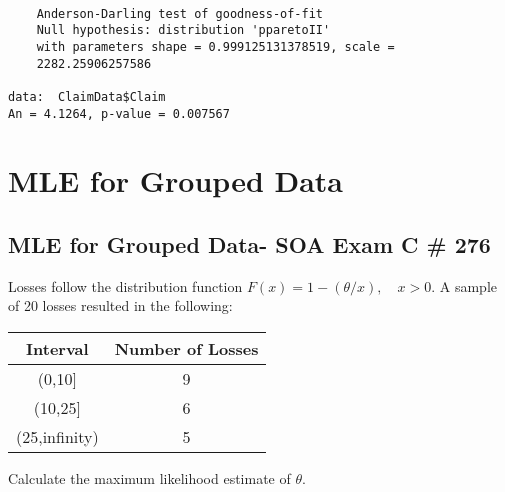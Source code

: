 \documentclass[]{book}
\newenvironment{Shaded}{\begin{snugshade}}{\end{snugshade}}
\newcommand{\KeywordTok}[1]{\textcolor[rgb]{0.13,0.29,0.53}{\textbf{#1}}}
\newcommand{\DataTypeTok}[1]{\textcolor[rgb]{0.13,0.29,0.53}{#1}}
\newcommand{\DecValTok}[1]{\textcolor[rgb]{0.00,0.00,0.81}{#1}}
\newcommand{\StringTok}[1]{\textcolor[rgb]{0.31,0.60,0.02}{#1}}
\newcommand{\CommentTok}[1]{\textcolor[rgb]{0.56,0.35,0.01}{\textit{#1}}}
\newcommand{\OtherTok}[1]{\textcolor[rgb]{0.56,0.35,0.01}{#1}}
\newcommand{\ControlFlowTok}[1]{\textcolor[rgb]{0.13,0.29,0.53}{\textbf{#1}}}
\newcommand{\OperatorTok}[1]{\textcolor[rgb]{0.81,0.36,0.00}{\textbf{#1}}}
\newcommand{\NormalTok}[1]{#1}
\theoremstyle{definition}
\theoremstyle{definition}
\theoremstyle{definition}
\theoremstyle{remark}
\begin{document}
\begin{verbatim}

    Anderson-Darling test of goodness-of-fit
    Null hypothesis: distribution 'pparetoII'
    with parameters shape = 0.999125131378519, scale =
    2282.25906257586

data:  ClaimData$Claim
An = 4.1264, p-value = 0.007567
\end{verbatim}

\section{MLE for Grouped Data}\label{mle-for-grouped-data}

\subsection{MLE for Grouped Data- SOA Exam C \#
276}\label{mle-for-grouped-data--soa-exam-c-276}

Losses follow the distribution function \(F(x)=1-(\theta/x),\quad x>0\).
A sample of 20 losses resulted in the following:

\begin{longtable}[]{@{}cc@{}}
\toprule
Interval & Number of Losses\tabularnewline
\midrule
\endhead
(0,10{]} & 9\tabularnewline
(10,25{]} & 6\tabularnewline
(25,infinity) & 5\tabularnewline
\bottomrule
\end{longtable}

Calculate the maximum likelihood estimate of \(\theta\).

\begin{Shaded}
\end{Shaded}
\end{document}

